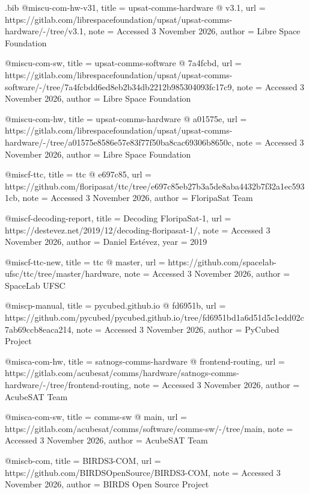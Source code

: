 \begin{filecontents*}[overwrite]{\jobname.bib}
@misc{u-com-hw-v31,
  title = {{upsat-\allowbreak{}comms-\allowbreak{}hardware @ v3.1}},
  url = {https://gitlab.com/librespacefoundation/upsat/upsat-comms-hardware/-/tree/v3.1},
  note = {Accessed 3 November 2026},
  author = {{Libre Space Foundation}}
}

@misc{u-com-sw,
  title = {{upsat-\allowbreak{}comms-\allowbreak{}software @ 7a4fcbd}},
  url = {https://gitlab.com/librespacefoundation/upsat/upsat-comms-software/-/tree/7a4fcbdd6ed8eb2b34db2212b985304093fc17c9},
  note = {Accessed 3 November 2026},
  author = {{Libre Space Foundation}}
}

@misc{u-com-hw,
  title = {{upsat-\allowbreak{}comms-\allowbreak{}hardware @ a01575e}},
  url = {https://gitlab.com/librespacefoundation/upsat/upsat-comms-hardware/-/tree/a01575e8586e57e83f77f50ba8cac69306b8650c},
  note = {Accessed 3 November 2026},
  author = {{Libre Space Foundation}}
}

@misc{f-ttc,
  title = {{ttc @ e697c85}},
  url = {https://github.com/floripasat/ttc/tree/e697c85eb27b3a5de8aba4432b7f32a1ec5931cb},
  note = {Accessed 3 November 2026},
  author = {{FloripaSat Team}}
}

@misc{f-decoding-report,
  title = {{Decoding FloripaSat-\allowbreak{}1}},
  url = {https://destevez.net/2019/12/decoding-floripasat-1/},
  note = {Accessed 3 November 2026},
  author = {{Daniel Estévez}},
  year = {2019}
}

@misc{f-ttc-new,
  title = {{ttc @ master}},
  url = {https://github.com/spacelab-ufsc/ttc/tree/master/hardware},
  note = {Accessed 3 November 2026},
  author = {{SpaceLab UFSC}}
}

@misc{p-manual,
  title = {{pycubed.github.io @ fd6951b}},
  url = {https://github.com/pycubed/pycubed.github.io/tree/fd6951bd1a6d51d5c1edd02c7ab69ccb8eaca214},
  note = {Accessed 3 November 2026},
  author = {{PyCubed Project}}
}

@misc{a-com-hw,
  title = {{satnogs-\allowbreak{}comms-\allowbreak{}hardware @ frontend-\allowbreak{}routing}},
  url = {https://gitlab.com/acubesat/comms/hardware/satnogs-comms-hardware/-/tree/frontend-routing},
  note = {Accessed 3 November 2026},
  author = {{AcubeSAT Team}}
}

@misc{a-com-sw,
  title = {{comms-\allowbreak{}sw @ main}},
  url = {https://gitlab.com/acubesat/comms/software/comms-sw/-/tree/main},
  note = {Accessed 3 November 2026},
  author = {{AcubeSAT Team}}
}

@misc{b-com,
  title = {{BIRDS3-\allowbreak{}COM}},
  url = {https://github.com/BIRDSOpenSource/BIRDS3-COM},
  note = {Accessed 3 November 2026},
  author = {{BIRDS Open Source Project}}
}


\end{filecontents*}
